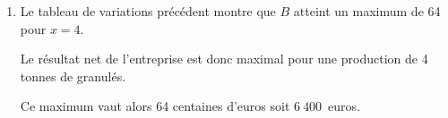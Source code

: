 \begin{corrige}
\begin{enumerate}
\begin{center}
\begin{extern}
               \end{extern}
          \end{center}
          \item Le tableau de variations précédent montre que $B$ atteint un maximum de 64 pour $x=4$.
          \par
          Le résultat net de l'entreprise est donc maximal pour une production de 4 tonnes de granulés.
          \par
          Ce maximum vaut alors 64 centaines d'euros soit $6\ 400$~euros.
          \par
     \end{enumerate}
\end{corrige}
